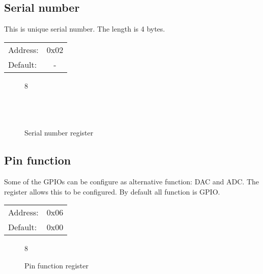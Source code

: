 \documentclass{article}
\begin{document}
	\subsection{Serial number}

		This is unique serial number. The length is 4 bytes.

		\begin{tabular}{ l c }
			Address: & 0x02 \\
			Default: & - \\
		\end{tabular}

		\begin{figure}[H]
			\centering
			\begin{bytefield}[
				bitwidth=0.1\linewidth]{8}
				 \\
				 \\
				 \\
				 \\
			\end{bytefield}
			\caption{Serial number register}
			\label{reg:serial}
		\end{figure}

	\subsection{Pin function}

		Some of the GPIOs can be configure as alternative function: DAC and ADC.
		The register allows this to be configured. By default all function is GPIO.

		\begin{tabular}{ l c }
			Address: & 0x06 \\
			Default: & 0x00 \\
		\end{tabular}

		\begin{figure}[H]
			\centering
			\begin{bytefield}[
				bitwidth=0.1\linewidth]{8}
				\bitheader[endianness=big, bitformatting={\small\bfseries}]{0-7} \\
				\bitboxes{1}{{-} {-} {-} {-} {-} {FUN2} {-} {FUN0}}
			\end{bytefield}
			\caption{Pin function register}
			\label{reg:pin_func}
		\end{figure}
\end{document}

